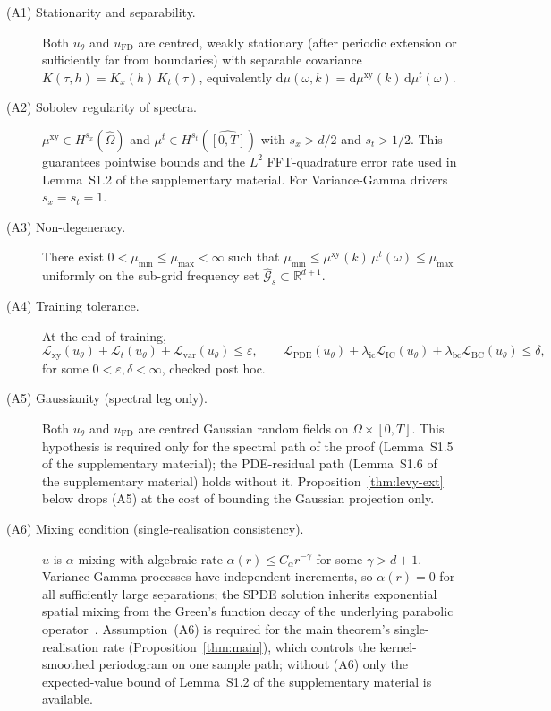 \documentclass[10pt]{elsarticle}
\begin{document}
\begin{description}
\item[(A1) Stationarity and separability.] Both \(u_\theta\) and
\(u_{\mathrm{FD}}\) are centred, weakly stationary (after periodic
extension or sufficiently far from boundaries) with separable
covariance \(K(\tau, h) = K_x(h)\,K_t(\tau)\), equivalently
\(\mathrm d\mu(\omega, k) = \mathrm d\mu^{\mathrm{xy}}(k)\,
\mathrm d\mu^t(\omega)\).

\item[(A2) Sobolev regularity of spectra.]
\(\mu^{\mathrm{xy}} \in H^{s_x}(\widehat\Omega)\) and
\(\mu^t \in H^{s_t}(\widehat{[0,T]})\) with \(s_x > d/2\) and
\(s_t > 1/2\). This guarantees pointwise bounds and the \(L^2\)
FFT-quadrature error rate used in Lemma~S1.2 of the supplementary material.
For Variance-Gamma drivers \(s_x = s_t = 1\).

\item[(A3) Non-degeneracy.] There exist
\(0 < \mu_{\min} \le \mu_{\max} < \infty\) such that
\(\mu_{\min} \le \mu^{\mathrm{xy}}(k)\,\mu^t(\omega) \le \mu_{\max}\)
uniformly on the sub-grid frequency set
\(\widehat{\mathcal G}_s \subset \mathbb R^{d+1}\).

\item[(A4) Training tolerance.] At the end of training,
\begin{equation}
\mathcal L_{\mathrm{xy}}(u_\theta) + \mathcal L_t(u_\theta)
+ \mathcal L_{\mathrm{var}}(u_\theta) \le \varepsilon, \qquad
\mathcal L_{\mathrm{PDE}}(u_\theta)
+ \lambda_{\mathrm{ic}}\mathcal L_{\mathrm{IC}}(u_\theta)
+ \lambda_{\mathrm{bc}}\mathcal L_{\mathrm{BC}}(u_\theta)
\le \delta,
\label{eq:tolerance}
\end{equation}
for some \(0 < \varepsilon, \delta < \infty\), checked post hoc.

\item[(A5) Gaussianity (spectral leg only).] Both \(u_\theta\) and
\(u_{\mathrm{FD}}\) are centred Gaussian random fields on
\(\Omega \times [0,T]\). This hypothesis is required only for the
spectral path of the proof (Lemma~S1.5 of the supplementary material); the
PDE-residual path (Lemma~S1.6 of the supplementary material) holds without it.
Proposition~\ref{thm:levy-ext} below drops (A5) at the cost of
bounding the Gaussian projection only.

\item[(A6) Mixing condition (single-realisation consistency).]
\(u\) is \(\alpha\)-mixing with algebraic rate
\(\alpha(r) \le C_\alpha r^{-\gamma}\) for some \(\gamma > d+1\).
Variance-Gamma processes have independent increments, so
\(\alpha(r) = 0\) for all sufficiently large separations; the SPDE
solution inherits exponential spatial mixing from the Green's
function decay of the underlying parabolic operator~\cite{ContTankov2003}.
Assumption~(A6) is required for the main theorem's
single-realisation rate (Proposition~\ref{thm:main}), which controls
the kernel-smoothed periodogram on one sample path; without (A6)
only the expected-value bound of Lemma~S1.2 of the supplementary material is
available.


\end{description}
\end{document}
